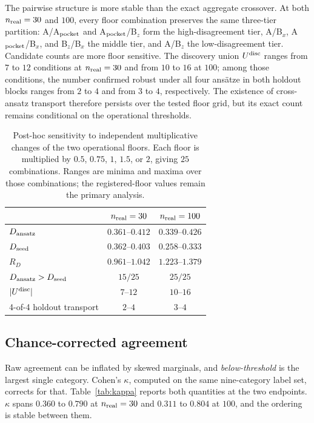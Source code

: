 \documentclass[aip,jap,reprint,onecolumn,superscriptaddress,longbibliography]{revtex4-2}
\begin{document}
The pairwise structure is more stable than the exact aggregate crossover. At
both $n_{\rm real}=30$ and $100$, every floor combination preserves the same
three-tier partition: A/A$_{\rm pocket}$ and A$_{\rm pocket}$/B$_z$ form the
high-disagreement tier, A/B$_x$, A$_{\rm pocket}$/B$_x$, and B$_z$/B$_x$ the
middle tier, and A/B$_z$ the low-disagreement tier. Candidate counts are more
floor sensitive. The discovery union $U^{\rm disc}$ ranges from $7$ to $12$
conditions at $n_{\rm real}=30$ and from $10$ to $16$ at $100$; among those
conditions, the number confirmed robust under all four ans\"atze in both
holdout blocks ranges from $2$ to $4$ and from $3$ to $4$, respectively. The
existence of cross-ansatz transport therefore persists over the tested floor
grid, but its exact count remains conditional on the operational thresholds.

\begin{table}[t]
\centering
\caption{Post-hoc sensitivity to independent multiplicative changes of the two
operational floors. Each floor is multiplied by $0.5$, $0.75$, $1$, $1.5$, or
$2$, giving $25$ combinations. Ranges are minima and maxima over those
combinations; the registered-floor values remain the primary analysis.}
\label{tab:floor_sensitivity}
\small
\begin{tabular}{lcc}
\toprule
 & $n_{\rm real}=30$ & $n_{\rm real}=100$ \\
\midrule
$D_{\rm ansatz}$ & $0.361$--$0.412$ & $0.339$--$0.426$ \\
$D_{\rm seed}$ & $0.362$--$0.403$ & $0.258$--$0.333$ \\
$R_D$ & $0.961$--$1.042$ & $1.223$--$1.379$ \\
$D_{\rm ansatz}>D_{\rm seed}$ & $15/25$ & $25/25$ \\
$|U^{\rm disc}|$ & $7$--$12$ & $10$--$16$ \\
4-of-4 holdout transport & $2$--$4$ & $3$--$4$ \\
\bottomrule
\end{tabular}
\end{table}

\subsection{Chance-corrected agreement}
Raw agreement can be inflated by skewed marginals, and \emph{below-threshold} is
the largest single category. Cohen's $\kappa$, computed on the same
nine-category label set, corrects for that. Table~\ref{tab:kappa} reports both
quantities at the two endpoints. $\kappa$ spans $0.360$ to $0.790$ at
$n_{\rm real}=30$ and $0.311$ to $0.804$ at $100$, and the ordering is stable
between them.
\end{document}
